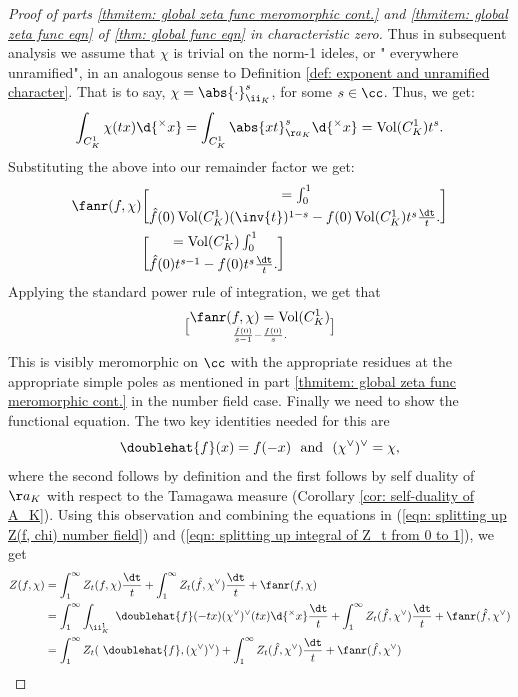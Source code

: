 \documentclass[11pt, x11names, openany]{book}
\begin{document}
\begin{proof}[Proof of parts \ref{thmitem: global zeta func meromorphic cont.} and \ref{thmitem: global zeta func eqn} of \ref{thm: global func eqn} in characteristic zero]
 Thus in subsequent analysis we assume that $\chi$ is trivial on the norm-1 ideles, or " everywhere unramified", in an analogous sense to Definition \ref{def: exponent and unramified character}. That is to say, $\chi = \abs{\cdot}_{\ii_K}^s$, for some $s \in \cc$. Thus, we get:
 \begin{equation*}
    \int_{C^1_K} \chi(tx) \d{^\times x} = \int_{C^1_K} \abs{xt}^s_{\aa_K} \d{^\times x} = \vol(C^1_K) t^s.
 \end{equation*}
 Substituting the above into our remainder factor we get:
 \begin{align*}
    \fanr(f, \chi) &= \int^1_0 \brack{ \hat{f}(0) \vol(C^1_K) (\inv{t})^{1-s} - f(0)  \vol(C^1_K) t^s} \frac{\dt}{t}.\\
    &= \vol(C^1_K) \int^1_0 \brack{\hat{f}(0)t^{s-1} - f(0)t^s} \frac{\dt}{t}.
 \end{align*}
 Applying the standard power rule of integration, we get that
 \begin{equation}
    \label{eqn: number-field remainder zeta function}
    \fanr(f, \chi) = \vol(C^1_K) \brack{\frac{\hat{f}(0)}{s-1} - \frac{f(0)}{s}}.
 \end{equation}
 This is visibly meromorphic on $\cc$ with the appropriate residues at the appropriate simple poles as mentioned in part \ref{thmitem: global zeta func meromorphic cont.} in the number field case.
Finally we need to show the functional equation. The two key identities needed for this are
\begin{equation*}
    \doublehat{f}(x) = f(-x) \ \text{ and } \ (\chi^\lor)^\lor = \chi,
\end{equation*}
where the second follows by definition and the first follows by self duality of $\aa_K$ with respect to the Tamagawa measure (Corollary \ref{cor: self-duality of A_K}). Using this observation and combining the equations in (\ref{eqn: splitting up Z(f, chi) number field}) and (\ref{eqn: splitting up integral of Z_t from 0 to 1}), we get
\begin{align*}
Z(f, \chi) &= \int_1^\infty Z_t(f, \chi) \frac{\dt}{t} + \int_1^\infty Z_t(\hat{f}, \chi^\lor) \frac{\dt}{t} + \fanr(f, \chi)\\
&= \int_1^\infty \int_{\ii^1_K} \ \doublehat{f}(-tx)(\chi^\lor)^\lor (tx) \d{^\times x} \frac{\dt}{t} + \int_1^\infty Z_t(\hat{f}, \chi^\lor) \frac{\dt}{t} + \fanr(\hat{f}, \chi^\lor)\\
&= \int_1^\infty Z_t(\ \doublehat{f}, (\chi^\lor)^\lor) + \int_1^\infty Z_t(\hat{f}, \chi^\lor) \frac{\dt}{t} + \fanr(\hat{f}, \chi^\lor)\\

\end{align*}
\end{proof}
\end{document}
